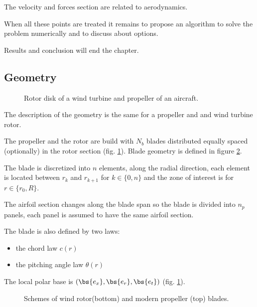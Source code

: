 The velocity and forces section are related to aerodynamics.

When all these points are treated it remains to propose an algorithm to solve
the problem numerically and to discuss about options.

Results and conclusion will end the chapter.



\subsection{Geometry}
\label{sec:wt_gmtry}

\begin{figure}
  \begin{center}
  
  \caption{Rotor disk  of a wind turbine and propeller of an aircraft.}
  \label{fig:rotor_and_propeller}
  \end{center}
  \end{figure}

The description of the geometry is the same for a propeller and and wind turbine rotor.

The propeller and the rotor are build with $N_b$ blades distributed equally spaced (optionally) in the rotor section 
(fig. \ref{fig:rotor_and_propeller}). 
Blade  geometry is defined in figure \ref{fig:blades}.

The blade is discretized into $n$ elements, along the radial direction, each element is located between $r_k$ and $r_{k+1}$
for $k \in \{ 0, n \}$ and the zone of interest is for $r \in \{r_0, R\}$.

The airfoil section changes along the blade span so the blade is divided into $n_p$ panels, each panel is assumed to have the same airfoil section.

The blade is also defined by two laws:
\begin{itemize}
  \item the chord law $c(r)$
  \item the pitching angle law $\theta(r)$
\end{itemize}


The local polar base is $(\bs{e_x},\bs{e_r},\bs{e_t})$ (fig. \ref{fig:rotor_and_propeller}).

\begin{figure}
\begin{center}

\caption{Schemes of wind rotor(bottom) and modern propeller (top) blades.}
\label{fig:blades}
\end{center}
\end{figure}

